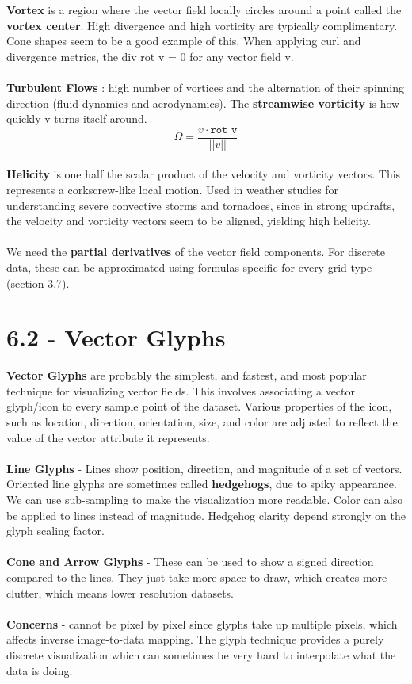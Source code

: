 \documentclass{article}
\begin{document}
\textbf{Vortex} is a region where the vector field locally circles around a point called the \textbf{vortex center}. High divergence and high vorticity are typically complimentary. Cone shapes seem to be a good example of this. When applying curl and divergence metrics, the div rot v = 0 for any vector field v.
\\\\
\textbf{Turbulent Flows} : high number of vortices and the alternation of their spinning direction (fluid dynamics and aerodynamics). The \textbf{streamwise vorticity} is how quickly v turns itself around.
\begin{equation}
    \Omega = \frac{v \cdot \texttt{rot v}}{||v||}
\end{equation}
\\
\textbf{Helicity} is one half the scalar product of the velocity and vorticity vectors. This represents a corkscrew-like local motion. Used in weather studies for understanding severe convective storms and tornadoes, since in strong updrafts, the velocity and vorticity vectors seem to be aligned, yielding high helicity.
\\\\
We need the \textbf{partial derivatives} of the vector field components. For discrete data, these can be approximated using formulas specific for every grid type (section 3.7).

\section*{6.2 - Vector Glyphs}
\textbf{Vector Glyphs} are probably the simplest, and fastest, and most popular technique for visualizing vector fields. This involves associating a vector glyph/icon to every sample point of the dataset. Various properties of the icon, such as location, direction, orientation, size, and color are adjusted to reflect the value of the vector attribute it represents.
\\\\
\textbf{Line Glyphs} - Lines show position, direction, and magnitude of a set of vectors. Oriented line glyphs are sometimes called \textbf{hedgehogs}, due to spiky appearance. We can use sub-sampling to make the visualization more readable. Color can also be applied to lines instead of magnitude. Hedgehog clarity depend strongly on the glyph scaling factor.
\\\\
\textbf{Cone and Arrow Glyphs} - These can be used to show a signed direction compared to the lines. They just take more space to draw, which creates more clutter, which means lower resolution datasets.
\\\\
\textbf{Concerns} - cannot be pixel by pixel since glyphs take up multiple pixels, which affects inverse image-to-data mapping. The glyph technique provides a purely discrete visualization which can sometimes be very hard to interpolate what the data is doing. 
\end{document}
